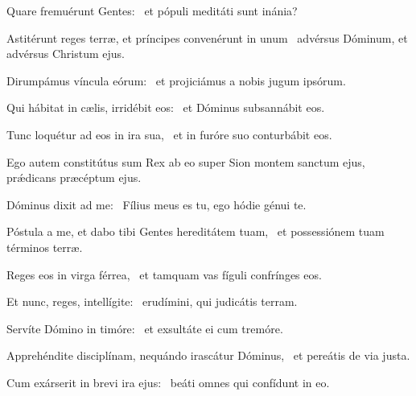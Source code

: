 \item Quare fremuérunt Gentes:~\psstar{} et pópuli meditáti sunt inánia?

\item Astitérunt reges terræ, et príncipes convenérunt in unum~\psstar{} advérsus Dóminum, et advérsus Christum ejus.

\item Dirumpámus víncula eórum:~\psstar{} et projiciámus a nobis jugum ipsórum.

\item Qui hábitat in cælis, irridébit eos:~\psstar{} et Dóminus subsannábit eos.

\item Tunc loquétur ad eos in ira sua,~\psstar{} et in furóre suo conturbábit eos.

\item Ego autem constitútus sum Rex ab eo super Sion montem sanctum ejus,~\psstar{} prǽdicans præcéptum ejus.

\item Dóminus dixit ad me:~\psstar{} Fílius meus es tu, ego hódie génui te.

\item Póstula a me, et dabo tibi Gentes hereditátem tuam,~\psstar{} et possessiónem tuam términos terræ.

\item Reges eos in virga férrea,~\psstar{} et tamquam vas fíguli confrínges eos.

\item Et nunc, reges, intellígite:~\psstar{} erudímini, qui judicátis terram.

\item Servíte Dómino in timóre:~\psstar{} et exsultáte ei cum tremóre.

\item Apprehéndite disciplínam, nequándo irascátur Dóminus,~\psstar{} et pereátis de via justa.

\item Cum exárserit in brevi ira ejus:~\psstar{} beáti omnes qui confídunt in eo.

